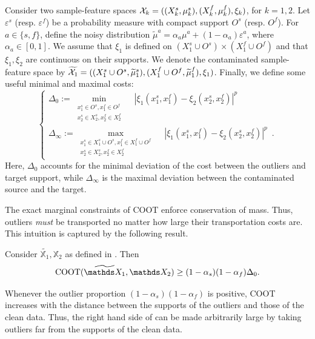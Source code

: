 \begin{assumption}
\label{assump:robust}
Consider two sample-feature spaces
$\mathcal X_k = ((X^s_k, \mu^s_k), (X^f_k, \mu^f_k), \xi_k)$, for $k=1,2$.
Let $\varepsilon^s$ (resp. $\varepsilon^f$) be a probability measure with
compact support $O^s$ (resp. $O^f$). For $a \in \{s, f\}$,
define the noisy distribution $\widetilde{\mu}^a = \alpha_a \mu^a + (1-\alpha_a) \varepsilon^a$,
where $\alpha_a \in [0,1]$. We assume that $\xi_1$ is defined on
$(X^s_1 \cup O^s) \times (X^f_1 \cup O^f)$ and
that $\xi_1, \xi_2$ are continuous on their supports.
We denote the contaminated sample-feature space by
$\widetilde{\mathcal X_1} = ((X^s_1 \cup O^s, \widetilde{\mu}^s_1), (X^f_1 \cup O^f, \widetilde{\mu}^f_1), \xi_1)$.
Finally, we define some useful minimal and maximal costs:
  \begin{equation}
    \begin{cases}
  \Delta_{0} := \min\limits_{
  \substack{
       x_1^s \in O^s, x_1^f \in O^f  \\
       x_2^s \in X_2^s, x_2^f \in X_2^f
  }}\quad |\xi_1(x_1^s, x_1^f) - \xi_2(x_2^s, x_2^f)|^p \\
  \Delta_{\infty} := \max\limits_{
  \substack{
  x_1^s \in X_1^s \cup O^s, x_1^f \in X_1^f \cup O^f \\
  x_2^s \in X_2^s, x_2^f \in X_2^f
  }} \quad|\xi_1(x_1^s, x_1^f) - \xi_2(x_2^s, x_2^f)|^p \enspace.
  \end{cases}
  \end{equation}
Here, $\Delta_{0}$ accounts for the minimal deviation of the cost between
the outliers and target support, while $\Delta_{\infty}$ is the maximal deviation
between the contaminated source and the target.
\end{assumption}
The exact marginal constraints of COOT enforce conservation of mass.
Thus, outliers \emph{must} be transported no matter how large their transportation costs are.
This intuition is captured by the following result.
\begin{proposition}
Consider $\widetilde{\mathds X_1}, \mathds X_2$ as defined in .
Then
\label{prop:coot_not_robust}
\begin{equation}
    \coot(\widetilde{\mathds X_1}, \mathds X_2) \geq (1 - \alpha_s)(1-\alpha_f)\Delta_0.
\end{equation}
\end{proposition}
Whenever the outlier proportion $(1-\alpha_s)(1-\alpha_f)$ is positive,
COOT increases with the distance between the supports of the outliers and those of the clean data.
Thus, the right hand side of  can be made arbitrarily
large by taking outliers far from the supports of the clean data.

